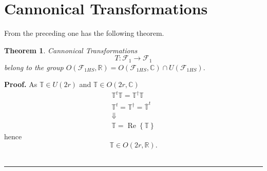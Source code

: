 \documentclass[aps, preprint]{revtex4}
\newtheorem{theorem}{Theorem}
\newenvironment{proof}[1][Proof]{\noindent\textbf{#1.} }{\ \rule{0.5em}{0.5em}}
\begin{document}
\section{Cannonical Transformations}
From the preceding one has the following theorem. 


\begin{theorem}
Cannonical Transformations
\begin{equation}T :\mathcal{F}_{1} \rightarrow \mathcal{F}_{1}
\end{equation}belong to the group $O \left (\mathcal{F}_{1 H S} ,\mathbb{R}\right ) =O \left (\mathcal{F}_{1 H S} ,\mathbb{C}\right ) \cap U \left (\mathcal{F}_{1 H S}\right )\text{.}$ 
\end{theorem}


\begin{proof}
As $\mathbb{T} \in U \left (2 r\right )$ and $\mathbb{T} \in O \left (2 r ,\mathbb{C}\right )$
\begin{gather}\mathbb{T}^{t} \mathbb{T} =\mathbb{T}^{ \dag } \mathbb{T} \\
\mathbb{T}^{t} =\mathbb{T}^{ \dag } =\overline{\mathbb{T}}^{t} \\
\Downarrow  \\
\mathbb{T} =\ensuremath{\operatorname*{Re}} \left \{\mathbb{T}\right \}\end{gather}hence
\begin{equation}\mathbb{T} \in O \left (2 r ,\mathbb{R}\right )\text{.}
\end{equation}
\end{proof}
\end{document}
